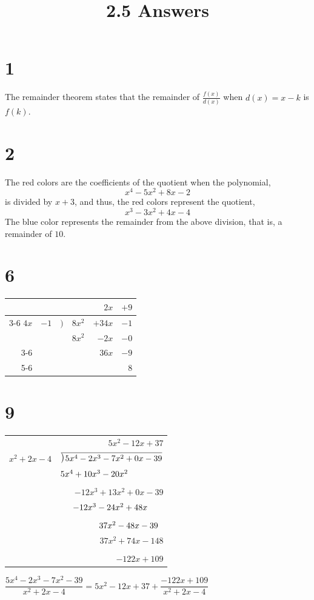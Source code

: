 \documentclass{article}
\title{2.5 Answers}
\newcommand\Mydiv[1]{%
\smash{\raise.3ex\hbox{$\big)$}}\mkern-8mu
        \overline{\enspace\strut#1}}
\theoremstyle{definition}
\begin{document}
\maketitle

\section*{1}
The remainder theorem states that the remainder of $\frac{f(x)}{d(x)}$ when $d(x)=x-k$ is $f(k)$.

\section*{2}
The red colors are the coefficients of the quotient when the polynomial, \[ x^4-5x^2+8x-2 \] is divided by $x+3$, and thus, 
the red colors represent the quotient, \[ x^3-3x^2+4x-4 \] The blue color represents the remainder from the above division, that is, a remainder of $10$.

\section*{6}
\begin{center}
	\begin{tabular}{rrrrrr}
	     &      &     &        & $2x$   & $+9$   \\
			  \cmidrule{3-6}
	$4x$ & $-1$ & $)$ & $8x^2$ & $+34x$ & $-1$  \\
	     &      &     & $8x^2$ & $-2x$  & $-0$ \\
			  \cmidrule{3-6}
             &      &     &        & $36x$  & $-9$           \\
		          \cmidrule{5-6}
	     &      &     &        &        & $8$
	\end{tabular}
\end{center}

\newpage
\section*{9}
        \begin{center}
                \begin{tabular}{lr}
			& $5x^2-12x+37$ \\
			$x^2+2x-4$ & $\Mydiv{5x^4-2x^3-7x^2+0x-39}$ \\[4pt]
			& $5x^4+10x^3-20x^2\hphantom{+0x-39}$ \\[-8pt]
			& \hrulefill\hphantom{+0x-39}\\[4pt]
			& $-12x^3+13x^2+0x-39$ \\[4pt]
			& $-12x^3-24x^2+48x\hphantom{-39}$ \\[-8pt]
			& \hphantom{$5x^4$}\hrulefill\hphantom{-39} \\[4pt]
			& $37x^2-48x-39\hphantom{1}$ \\[4pt]
			& $37x^2+74x-148$ \\[-8pt]
			& \hphantom{$5x^4-12x^3$}\hrulefill \\[4pt]
			& $-122x+109$
                \end{tabular}
        \end{center}
$\dfrac{5x^4-2x^3-7x^2-39}{x^2+2x-4}=5x^2-12x+37+\dfrac{-122x+109}{x^2+2x-4}$
\end{document}

